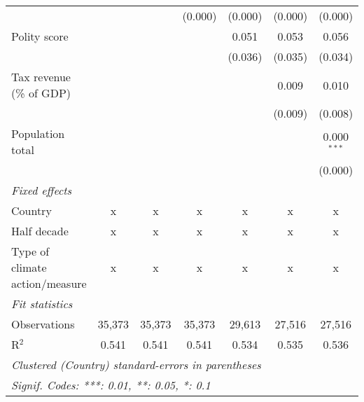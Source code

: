 \begin{tabular}{lcccccc}
                                                                                     &               &               & (0.000)       & (0.000)       & (0.000)       & (0.000)\\   
   Polity score                                                                      &               &               &               & 0.051         & 0.053         & 0.056\\   
                                                                                     &               &               &               & (0.036)       & (0.035)       & (0.034)\\   
   Tax revenue (\% of GDP)                                                           &               &               &               &               & 0.009         & 0.010\\   
                                                                                     &               &               &               &               & (0.009)       & (0.008)\\   
   Population total                                                                  &               &               &               &               &               & 0.000$^{***}$\\   
                                                                                     &               &               &               &               &               & (0.000)\\   
   \emph{Fixed effects}\\
   Country                                                                           & x             & x             & x             & x             & x             & x\\  
   Half decade                                                                       & x             & x             & x             & x             & x             & x\\  
   Type of climate action/measure                                                    & x             & x             & x             & x             & x             & x\\  
   \midrule \emph{Fit statistics}\\
   Observations                                                                      & 35,373        & 35,373        & 35,373        & 29,613        & 27,516        & 27,516\\  
   R$^2$                                                                             & 0.541         & 0.541         & 0.541         & 0.534         & 0.535         & 0.536\\  
   \midrule
   \multicolumn{7}{l}{\emph{Clustered (Country) standard-errors in parentheses}}\\
   \multicolumn{7}{l}{\emph{Signif. Codes: ***: 0.01, **: 0.05, *: 0.1}}\\
\end{tabular}
\par\endgroup


